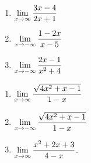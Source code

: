  \begin{multicols}{3}
\begin{enumerate}
\setcounter{enumi}{\value{HW}}

\item\label{limitatinfinityfirst}   $\displaystyle{ \lim_{x \rightarrow \infty} \dfrac{3x-4}{2x+1}}$

\item $\displaystyle{ \lim_{x \rightarrow -\infty}  \dfrac{1-2x}{x-5}}$ 

\item $\displaystyle{ \lim_{x \rightarrow -\infty}\dfrac{2x-1}{x^2+4}}$

\setcounter{HW}{\value{enumi}}
\end{enumerate}
\end{multicols}

 \begin{multicols}{3}
\begin{enumerate}
\setcounter{enumi}{\value{HW}}
\item $\displaystyle{ \lim_{x \rightarrow \infty}\dfrac{\sqrt{4x^2+x-1}}{1-x}}$

\item $\displaystyle{ \lim_{x \rightarrow -\infty}\dfrac{\sqrt{4x^2+x-1}}{1-x}}$

\item\label{limitatinfinitylast}  $\displaystyle{ \lim_{x \rightarrow \infty} \dfrac{x^2+2x+3}{4-x}}$.

\setcounter{HW}{\value{enumi}}
\end{enumerate}
\end{multicols}

